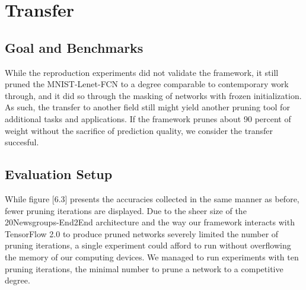 
\section{Transfer}
\subsection*{Goal and Benchmarks}
While the reproduction experiments did not validate the framework, it still pruned the MNIST-Lenet-FCN to a degree comparable to contemporary work through, and it did so through the masking of networks with frozen initialization. As such, the transfer to another field still might yield another pruning tool for additional tasks and applications. If the framework prunes about 90 percent of weight without the sacrifice of prediction quality, we consider the transfer succesful.
\subsection*{Evaluation Setup}
While figure [6.3] presents the accuracies collected in the same manner as before, fewer pruning iterations are displayed. Due to the sheer size of the 20Newsgroups-End2End architecture and the way our framework interacts with TensorFlow 2.0 to produce pruned networks severely limited the number of pruning iterations, a single experiment could afford to run without overflowing the memory of our computing devices. We managed to run experiments with ten pruning iterations, the minimal number to prune a network to a competitive degree.
